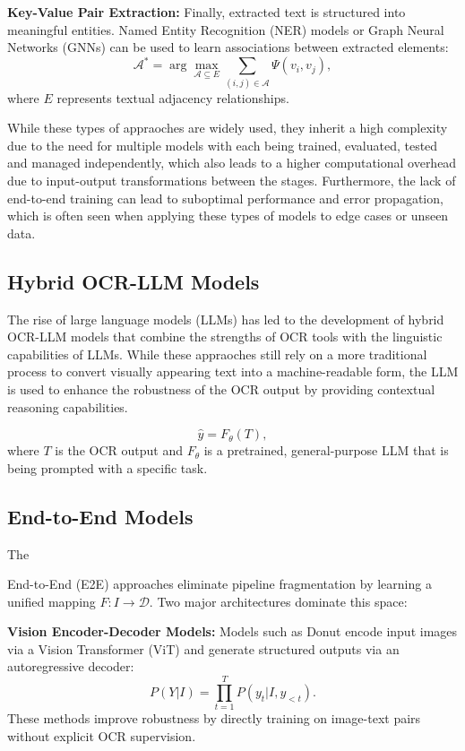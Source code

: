 \documentclass[11pt]{article}
\begin{document}
\textbf{Key-Value Pair Extraction:} Finally, extracted text is structured into meaningful entities. Named Entity Recognition (NER) models or Graph Neural Networks (GNNs) can be used to learn associations between extracted elements:
\begin{equation}
    \mathcal{A}^* = \arg\max_{\mathcal{A} \subseteq E} \sum_{(i,j) \in \mathcal{A}} \Psi(v_i, v_j),
\end{equation}
where $E$ represents textual adjacency relationships.

While these types of appraoches are widely used, they inherit a high complexity due to the need for multiple models with each being trained, evaluated, tested and managed independently, which also leads to a higher computational overhead due to input-output transformations between the stages. Furthermore, the lack of end-to-end training can lead to suboptimal performance and error propagation, which is often seen when applying these types of models to edge cases or unseen data.

\subsection{Hybrid OCR-LLM Models}
The rise of large language models (LLMs) has led to the development of hybrid OCR-LLM models that combine the strengths of OCR tools with the linguistic capabilities of LLMs. While these appraoches still rely on a more traditional process to convert visually appearing text into a machine-readable form, the LLM is used to enhance the robustness of the OCR output by providing contextual reasoning capabilities.

\begin{equation}
    \hat{y} = F_\theta (T),
\end{equation}
where $T$ is the OCR output and $F_\theta$ is a pretrained, general-purpose LLM that is being prompted with a specific task. 

\subsection{End-to-End Models}
The 

End-to-End (E2E) approaches eliminate pipeline fragmentation by learning a unified mapping $F: I \to \mathcal{D}$. Two major architectures dominate this space:

\textbf{Vision Encoder-Decoder Models:} Models such as Donut \cite{kim2022donut} encode input images via a Vision Transformer (ViT) and generate structured outputs via an autoregressive decoder:
\begin{equation}
    P(Y | I) = \prod_{t=1}^{T} P(y_t | I, y_{<t}).
\end{equation}
These methods improve robustness by directly training on image-text pairs without explicit OCR supervision.
\end{document}
